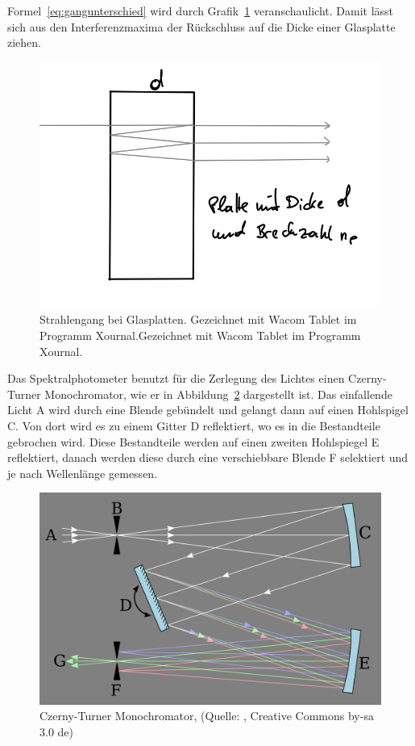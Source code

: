 \documentclass{article}
\begin{document}
Formel~\eqref{eq:gangunterschied} wird durch Grafik~\ref{fig:aufbau3} veranschaulicht. Damit lässt sich aus den Interferenzmaxima der Rückschluss auf die Dicke einer Glasplatte ziehen. 

\begin{figure}[H]
\caption{Strahlengang bei Glasplatten. Gezeichnet mit Wacom Tablet im Programm Xournal.Gezeichnet mit Wacom Tablet im Programm Xournal.}
\label{fig:aufbau3}
\includegraphics[scale=1.]{aufbau3.png}
\end{figure}


Das Spektralphotometer benutzt für die Zerlegung des Lichtes einen Czerny-Turner Monochromator, wie er in Abbildung~\ref{fig:monochromator} dargestellt ist. Das einfallende Licht A wird durch eine Blende gebündelt und gelangt dann auf einen Hohlspigel C. Von dort wird es zu einem Gitter D reflektiert, wo es in die Bestandteile gebrochen wird. Diese Bestandteile werden auf einen zweiten Hohlspiegel E reflektiert, danach werden diese durch eine verschiebbare Blende F selektiert und je nach Wellenlänge gemessen.

\begin{figure}[H]
\caption{Czerny-Turner Monochromator, (Quelle: \cite{monochromator}, Creative Commons by-sa 3.0 de)}
\label{fig:monochromator}
\includegraphics[scale=0.1]{monochromator.png}
\end{figure}
\end{document}
